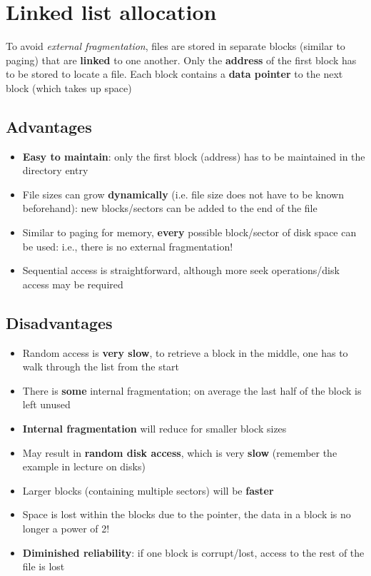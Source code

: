 \documentclass{article}
\begin{document}
\section{Linked list allocation}
\begin{flushleft}
To avoid \textit{external fragmentation}, files are stored in separate blocks (similar to paging) that are \textbf{linked} to one another. Only the \textbf{address} of the first block has to be stored to locate a file. Each block contains a \textbf{data pointer} to the next block (which takes up space)
\end{flushleft}

\subsection{Advantages}
\begin{itemize}
	\item \textbf{Easy to maintain}: only the first block (address) has to be maintained in the directory entry
	\item File sizes can grow \textbf{dynamically} (i.e. file size does not have to be known beforehand): new blocks/sectors can be added to the end of the file
	\item Similar to paging for memory, \textbf{every} possible block/sector of disk space can be used: i.e., there is no external fragmentation!
	\item Sequential access is straightforward, although more seek operations/disk access may be required
\end{itemize}

\subsection{Disadvantages}
\begin{itemize}
	\item Random access is \textbf{very slow}, to retrieve a block in the middle, one has to walk through the list from the start
	\item There is \textbf{some} internal fragmentation; on average the last half of the block is left unused
	\item \textbf{Internal fragmentation} will reduce for smaller block sizes
	\item May result in \textbf{random disk access}, which is very \textbf{slow} (remember the example in lecture on disks)
	\item Larger blocks (containing multiple sectors) will be \textbf{faster}
	\item Space is lost within the blocks due to the pointer, the data in a block is no longer a power of 2!
	\item \textbf{Diminished reliability}: if one block is corrupt/lost, access to the rest of the file is lost
\end{itemize}
\end{document}
